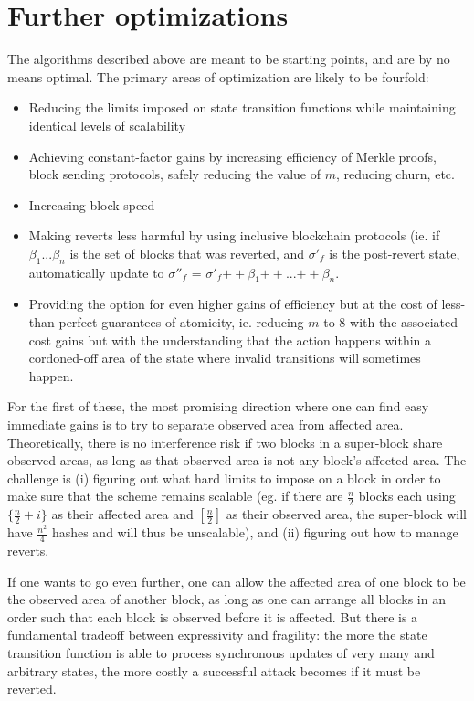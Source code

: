 \documentclass[11pt,a4paper]{report}
\theoremstyle{plain}
\theoremstyle{definition}
\theoremstyle{remark}
\begin{document}
\chapter{Further optimizations}

The algorithms described above are meant to be starting points, and are by no means optimal. The primary areas of optimization are likely to be fourfold:

\begin{itemize}
\item
Reducing the limits imposed on state transition functions while maintaining identical levels of scalability
\item
Achieving constant-factor gains by increasing efficiency of Merkle proofs, block sending protocols, safely reducing the value of $m$, reducing churn, etc.
\item
Increasing block speed
\item
Making reverts less harmful by using inclusive blockchain protocols (ie. if $\beta_1 ... \beta_n$ is the set of blocks that was reverted, and $\sigma'_f$ is the post-revert state, automatically update to $\sigma''_f$ = $\sigma'_f {++} \beta_1 {++} ... {++} \beta_n$.
\item
Providing the option for even higher gains of efficiency but at the cost of less-than-perfect guarantees of atomicity, ie. reducing $m$ to $8$ with the associated cost gains but with the understanding that the action happens within a cordoned-off area of the state where invalid transitions will sometimes happen.
\end{itemize}

For the first of these, the most promising direction where one can find easy immediate gains is to try to separate observed area from affected area. Theoretically, there is no interference risk if two blocks in a super-block share observed areas, as long as that observed area is not any block's affected area. The challenge is (i) figuring out what hard limits to impose on a block in order to make sure that the scheme remains scalable (eg. if there are $\frac{n}{2}$ blocks each using $\{\frac{n}{2}+i\}$ as their affected area and $[\frac{n}{2}]$ as their observed area, the super-block will have $\frac{n^2}{4}$ hashes and will thus be unscalable), and (ii) figuring out how to manage reverts.

If one wants to go even further, one can allow the affected area of one block to be the observed area of another block, as long as one can arrange all blocks in an order such that each block is observed before it is affected. But there is a fundamental tradeoff between expressivity and fragility: the more the state transition function is able to process synchronous updates of very many and arbitrary states, the more costly a successful attack becomes if it must be reverted.
\end{document}
